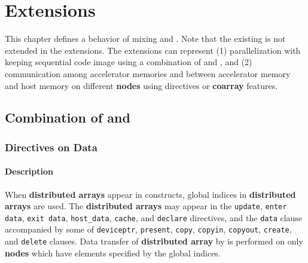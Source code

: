 \chapter{{\XMP} Extensions}\label{chap:xmp-ex}
This chapter defines a behavior of mixing {\XMP} and {\OACC}.
Note that the existing {\OACC} is not extended in the {\XMP} extensions.
The {\XMP} extensions can represent 
(1) parallelization with keeping sequential code image using a combination of {\XMP} and {\OACC},
and
(2) communication among accelerator memories and between accelerator memory and host memory on different {\bf nodes}
using {\XACC} directives or {\bf coarray} features.

\section{Combination of {\XMP} and {\OACC}}
\subsection{{\OACC} Directives on Data}
\subsubsection*{Description}
When {\bf distributed arrays} appear in {\OACC} constructs,
global indices in {\bf distributed arrays} are used.
The {\bf distributed arrays} may appear in the {\tt update}, {\tt enter data}, {\tt exit data}, 
{\tt host\_data}, {\tt cache}, and {\tt declare} directives,
and the {\tt data} clause accompanied by some of 
{\tt deviceptr}, {\tt present}, {\tt copy}, {\tt copyin}, 
{\tt copyout}, {\tt create}, and {\tt delete} clauses.
Data transfer of {\bf distributed array} by {\OACC} is performed on only {\bf nodes} which have elements specified by the global indices.

